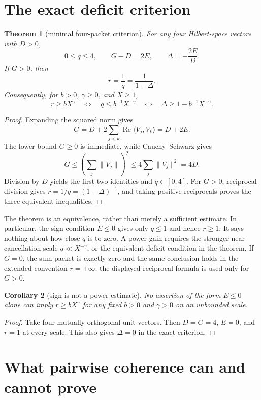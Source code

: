 \documentclass[11pt]{article}
\newtheorem{theorem}{Theorem}
\newtheorem{corollary}[theorem]{Corollary}
\begin{document}
\section{The exact deficit criterion}

\begin{theorem}[minimal four-packet criterion]
For any four Hilbert-space vectors with $D>0$,
\[
 0\leq q\leq4,\qquad G-D=2E,\qquad \Delta=-\frac{2E}{D}.
\]
If $G>0$, then
\[
 r=\frac1q=\frac1{1-\Delta}.
\]
Consequently, for $b>0$, $\gamma\geq0$, and $X\geq1$,
\[
 r\geq bX^\gamma
 \quad\Longleftrightarrow\quad
 q\leq b^{-1}X^{-\gamma}
 \quad\Longleftrightarrow\quad
 \Delta\geq1-b^{-1}X^{-\gamma}.
\]
\end{theorem}

\begin{proof}
Expanding the squared norm gives
\[
 G=D+2\sum_{j<k}\operatorname{Re}\langle V_j,V_k\rangle=D+2E.
\]
The lower bound $G\geq0$ is immediate, while Cauchy--Schwarz gives
\[
 G\leq\left(\sum_j\|V_j\|\right)^2
 \leq4\sum_j\|V_j\|^2=4D.
\]
Division by $D$ yields the first two identities and $q\in[0,4]$.
For $G>0$, reciprocal division gives $r=1/q=(1-\Delta)^{-1}$, and taking
positive reciprocals proves the three equivalent inequalities.
\end{proof}

The theorem is an equivalence, rather than merely a sufficient estimate.
In particular, the sign condition $E\leq0$ gives only $q\leq1$ and hence
$r\geq1$.  It says nothing about how close $q$ is to zero.  A power gain
requires the stronger near-cancellation scale
$q\ll X^{-\gamma}$, or the equivalent deficit condition in the theorem.
If $G=0$, the sum packet is exactly zero and the same conclusion holds in
the extended convention $r=+\infty$; the displayed reciprocal formula is
used only for $G>0$.

\begin{corollary}[sign is not a power estimate]
No assertion of the form $E\leq0$ alone can imply
$r\geq bX^\gamma$ for any fixed $b>0$ and $\gamma>0$ on an unbounded scale.
\end{corollary}

\begin{proof}
Take four mutually orthogonal unit vectors.  Then $D=G=4$, $E=0$, and
$r=1$ at every scale.  This also gives $\Delta=0$ in the exact criterion.
\end{proof}

\section{What pairwise coherence can and cannot prove}
\end{document}
